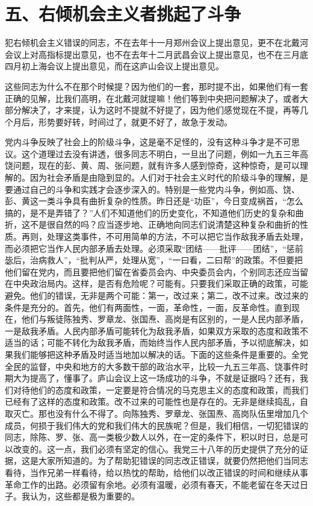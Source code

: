 \date{一九五九八月十六日年}
\section{五、右倾机会主义者挑起了斗争}

犯右倾机会主义错误的同志，不在去年十一月郑州会议上提出意见，更不在北戴河会议上对高指标提出意见，也不在去年十二月武昌会议上提出意见，也不在三月底四月初上海会议上提出意见，而在这庐山会议上提出意见。

这些同志为什么不在那个时候提？因为他们的一套，那时提不出，如果他们有一套正确的见解，比我们高明，在北戴河就提嘛！他们等到中央把问题解决了，或者大部分解决了，才来提，认为这时不提就不好提了，因为他们感觉现在不提，再等几个月后，形势要好转，时间过了，就更不好了，故急于发动。

党内斗争反映了社会上的阶级斗争，这是毫不足怪的，没有这种斗争才是不可思议。这个道理过去没有讲透，很多同志不明白，一旦出了问题，例如一九五三年高饶问题，现在的彭、黄、周、张问题，就有许多人感到惊奇，这种惊奇，是可以理解的。因为社会矛盾是由隐到显的。人们对于社会主义时代的阶级斗争的理解，是要通过自己的斗争和实践才会逐步深入的。特别是一些党内斗争，例如高、饶、彭、黄这一类斗争具有曲折复杂的性质。昨日还是“功臣”，今日变成祸首，“怎么搞的，是不是弄错了？”人们不知道他们的历史变化，不知道他们历史的复杂和曲折，这不是很自然的吗？应当逐步地、正确地向同志们说清楚这种复杂和曲折的性质。再则，处理这类事件，不可用简单的方法，不可以把它当作敌我矛盾去处理，而必须把它当作人民内部矛盾去处理。必须采取“团结——批评——团结”，“惩前毖后，治病救人”，“批判从严，处理从宽”，“一曰看，二曰帮”的政策。不但要把他们留在党内，而且要把他们留在省委员会内、中央委员会内，个别同志还应当留在中央政治局内。这样，是否有危险呢？可能有。只要我们采取正确的政策，可能避免。他们的错误，无非是两个可能：第一，改过来；第二，改不过来。改过来的条件是充分的。首先，他们有两面性，一面，革命性，一面，反革命性。直到现在，他们与叛徒陈独秀、罗章龙、张国焘、高岗是有区别的，一是人民内部矛盾，一是敌我矛盾。人民内部矛盾可能转化为敌我矛盾，如果双方采取的态度和政策不适当的话；可能不转化为敌我矛盾，而始终当作人民内部矛盾，予以彻底解决，如果我们能够把这种矛盾及时适当地加以解决的话。下面的这些条件是重要的。全党全民的监督，中央和地方的大多数干部的政治水平，比较一九五三年高、饶事件时期大为提高了，懂事了。庐山会议上这一场成功的斗争，不就是证据吗？还有，我们对待他们的态度和政策，一定要是符合情况的马克思主义的态度和政策，而我们已经有了这样的态度和政策。改不过来的可能性也是存在的。无非是继续捣乱，自取灭亡。那也没有什么不得了。向陈独秀、罗章龙、张国焘、高岗队伍里增加几个成员，何损于我们伟大的党和我们伟大的民族呢？但是，我们相信，一切犯错误的同志，除陈、罗、张、高一类极少数人以外，在一定的条件下，积以时日，总是可以改变的。这一点，我们必须有坚定的信心。我党三十八年的历史提供了充分的证据，这是大家所知道的。为了帮助犯错误的同志改正错误，就要仍然把他们当同志看待，当作兄弟一样看待，给以热忱的帮助，给他们以改正错误的时间和继续从事革命工作的出路。必须留有余地。必须有温暖，必须有春天，不能老留在冬天过日子。我认为，这些都是极为重要的。


